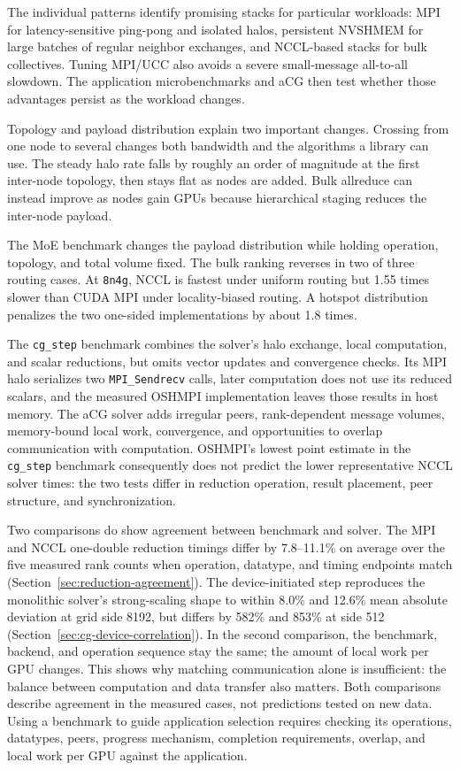 The individual patterns identify promising stacks for particular workloads: MPI for latency-sensitive ping-pong and isolated halos, persistent NVSHMEM for large batches of regular neighbor exchanges, and NCCL-based stacks for bulk collectives. Tuning MPI/UCC also avoids a severe small-message all-to-all slowdown. The application microbenchmarks and aCG then test whether those advantages persist as the workload changes.

Topology and payload distribution explain two important changes. Crossing from one node to several changes both bandwidth and the algorithms a library can use. The steady halo rate falls by roughly an order of magnitude at the first inter-node topology, then stays flat as nodes are added. Bulk allreduce can instead improve as nodes gain GPUs because hierarchical staging reduces the inter-node payload.

The MoE benchmark changes the payload distribution while holding operation, topology, and total volume fixed. The bulk ranking reverses in two of three routing cases. At \texttt{8n4g}, NCCL is fastest under uniform routing but 1.55 times slower than CUDA MPI under locality-biased routing. A hotspot distribution penalizes the two one-sided implementations by about 1.8 times.

The \texttt{cg\_step} benchmark combines the solver's halo exchange, local computation, and scalar reductions, but omits vector updates and convergence checks. Its MPI halo serializes two \texttt{MPI\_Sendrecv} calls, later computation does not use its reduced scalars, and the measured OSHMPI implementation leaves those results in host memory. The aCG solver adds irregular peers, rank-dependent message volumes, memory-bound local work, convergence, and opportunities to overlap communication with computation. OSHMPI's lowest point estimate in the \texttt{cg\_step} benchmark consequently does not predict the lower representative NCCL solver times: the two tests differ in reduction operation, result placement, peer structure, and synchronization.

Two comparisons do show agreement between benchmark and solver. The MPI and NCCL one-double reduction timings differ by 7.8--11.1\% on average over the five measured rank counts when operation, datatype, and timing endpoints match (Section~\ref{sec:reduction-agreement}). The device-initiated step reproduces the monolithic solver's strong-scaling shape to within 8.0\% and 12.6\% mean absolute deviation at grid side 8192, but differs by 582\% and 853\% at side 512 (Section~\ref{sec:cg-device-correlation}). In the second comparison, the benchmark, backend, and operation sequence stay the same; the amount of local work per GPU changes. This shows why matching communication alone is insufficient: the balance between computation and data transfer also matters. Both comparisons describe agreement in the measured cases, not predictions tested on new data. Using a benchmark to guide application selection requires checking its operations, datatypes, peers, progress mechanism, completion requirements, overlap, and local work per GPU against the application.

